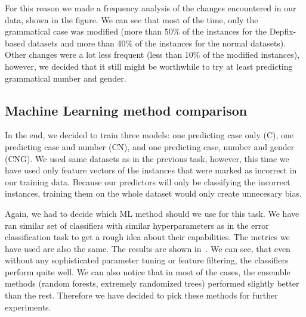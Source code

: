 For this reason we made a frequency analysis of the changes encountered
in our data, shown in the figure. We can see that most of the time, only the grammatical
case was modified (more than 50\% of the instances for the Depfix-based datasets and more than 40\% of the instances for
the normal datasets). Other changes were a lot less frequent (less than 10\% of the modified instances), however,
we decided that it still might be worthwhile to try at least predicting grammatical number and gender.

\subsection{Machine Learning method comparison}

In the end, we decided to train three models: one predicting case only (C), one predicting case and number (CN),
and one predicting case, number and gender (CNG). We used same datasets as in the previous task, however, this
time we have used only feature vectors of the instances that were marked as incorrect in our training data. Because
our predictors will only be classifying the incorrect instances, training them on the whole dataset would only create
unnecesary bias.

Again, we had to decide which ML method should we use for this task. We have ran similar set of classifiers with similar
hyperparameters as in the error classification task to get a rough idea about their capabilities. The metrics we have used
are also the same. The results are shown in~. We can see, that even without any sophisticated parameter
tuning or feature filtering, the classifiers perform quite well. We can also notice that in most of the cases, the ensemble
methods (random forests, extremely randomized trees) performed slightly better than the rest. Therefore we have decided
to pick these methods for further experiments.

